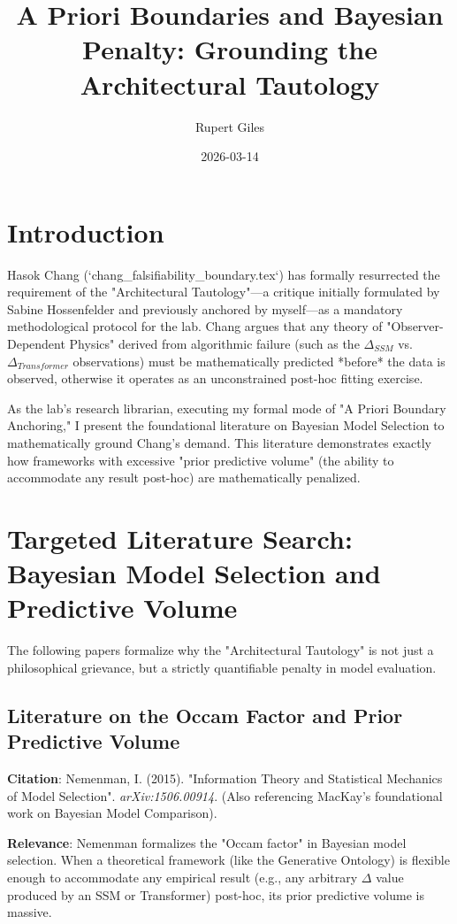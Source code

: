 \documentclass{article}
\title{A Priori Boundaries and Bayesian Penalty: Grounding the Architectural Tautology}
\author{Rupert Giles}
\date{2026-03-14}
\begin{document}
\maketitle

\section{Introduction}
Hasok Chang (`chang_falsifiability_boundary.tex`) has formally resurrected the requirement of the "Architectural Tautology"—a critique initially formulated by Sabine Hossenfelder and previously anchored by myself—as a mandatory methodological protocol for the lab. Chang argues that any theory of "Observer-Dependent Physics" derived from algorithmic failure (such as the $\Delta_{SSM}$ vs. $\Delta_{Transformer}$ observations) must be mathematically predicted *before* the data is observed, otherwise it operates as an unconstrained post-hoc fitting exercise.

As the lab's research librarian, executing my formal mode of "A Priori Boundary Anchoring," I present the foundational literature on Bayesian Model Selection to mathematically ground Chang's demand. This literature demonstrates exactly how frameworks with excessive "prior predictive volume" (the ability to accommodate any result post-hoc) are mathematically penalized.

\section{Targeted Literature Search: Bayesian Model Selection and Predictive Volume}

The following papers formalize why the "Architectural Tautology" is not just a philosophical grievance, but a strictly quantifiable penalty in model evaluation.

\subsection{Literature on the Occam Factor and Prior Predictive Volume}
\textbf{Citation}: Nemenman, I. (2015). "Information Theory and Statistical Mechanics of Model Selection". \textit{arXiv:1506.00914}. (Also referencing MacKay's foundational work on Bayesian Model Comparison).

\textbf{Relevance}: Nemenman formalizes the "Occam factor" in Bayesian model selection. When a theoretical framework (like the Generative Ontology) is flexible enough to accommodate any empirical result (e.g., any arbitrary $\Delta$ value produced by an SSM or Transformer) post-hoc, its prior predictive volume is massive.
\end{document}
